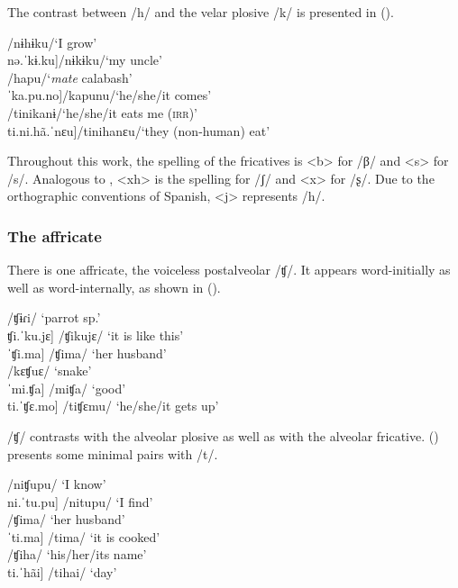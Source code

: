 The contrast between /h/ and the velar plosive /k/ is presented in (). 
 
    
\ea\label{ex:h-k}
\ea    \tab[nə.ˈhɨ̃.ku]\tab\tab /nɨhɨku/\tab ‘I grow’\\
    \tab{[}nə.ˈkɨ.ku]\tab\tab /nɨkɨku/\tab ‘my uncle’\\
\ex    \tab[ˈhã.pu]\tab\tab /hapu/\tab ‘\textit{mate} calabash’\\
    \tab{[}ˈka.pu.no]\tab\tab /kapunu/\tab ‘he/she/it comes’\\
\ex    \tab[ti.ˈni.ka.nə]\tab\tab /tinikanɨ/\tab ‘he/she/it eats me (\textsc{irr})’\\
    \tab{[}ti.ni.hã.ˈnɛu]\tab /tinihanɛu/\tab ‘they (non-human) eat’\\%
\z
\xe

Throughout this work, the spelling of the fricatives is <b> for /β/ and <s> for /s/.  Analogous to , <xh> is the spelling for /ʃ/ and <x> for /ʂ/. Due to the orthographic conventions of Spanish, <j> represents /h/. 

\subsubsection{The affricate}
There is one affricate, the voiceless postalveolar /ʧ/. It appears word-initially as well as word-internally, as shown in ().

\ea\label{ex:ch}
\ea     \tab[ˈʧɨ.ɾi] \tab /ʧɨɾi/ \tab\tab ‘parrot sp.’\\
     \tab{[}ʧi.ˈku.jɛ] \tab /ʧikujɛ/ \tab ‘it is like this’\\
     \tab{[}ˈʧi.ma] \tab /ʧima/ \tab ‘her husband’\\
\ex     \tab[kɛ.ˈʧu.ɛ] \tab /kɛʧuɛ/ \tab ‘snake’\\
     \tab{[}ˈmi.ʧa] \tab /miʧa/ \tab ‘good’\\
     \tab{[}ti.ˈʧɛ.mo] \tab /tiʧɛmu/ \tab ‘he/she/it gets up’\\%
\z
\xe

/ʧ/ contrasts with the alveolar plosive as well as with the alveolar fricative. () presents some minimal pairs with /t/.

\ea\label{ex:ch-t}
\ea     \tab[ni.ˈʧu.pu] \tab /niʧupu/ \tab ‘I know’\\
     \tab{[}ni.ˈtu.pu] \tab /nitupu/ \tab ‘I find’\\
\ex    \tab[ˈʧi.ma] \tab /ʧima/ \tab ‘her husband’\\
    \tab{[}ˈti.ma] \tab /tima/ \tab ‘it is cooked’\\
 \ex  \tab[ˈʧi.hã] \tab /ʧiha/ \tab ‘his/her/its name’\\
     \tab{[}ti.ˈhãi] \tab /tihai/ \tab ‘day’\\%
\z
    \xe

